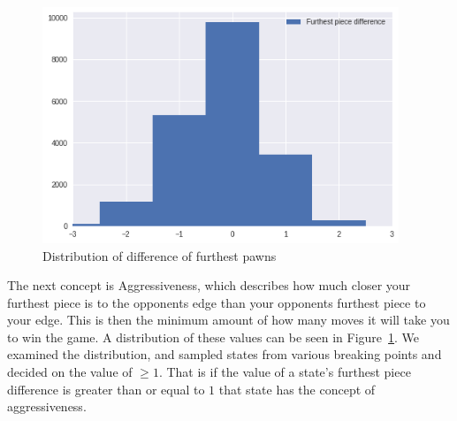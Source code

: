 \begin{figure}
    \begin{small}
        \begin{center}
            \includegraphics[width=0.95\textwidth]{graphics/dist_aggressiveness}
        \end{center}
        \caption{Distribution of difference of furthest pawns}
        \label{fig:dist_aggressiveness}
    \end{small}
\end{figure}


The next concept is Aggressiveness, which describes how much closer your furthest piece is to the opponents edge than your opponents furthest piece to your edge. This is then the minimum amount of how many moves it will take you to win the game. A distribution of these values can be seen in Figure~\ref{fig:dist_aggressiveness}. We examined the distribution, and sampled states from various breaking points and decided on the value of $\geq 1$. That is if the value of a state's furthest piece difference is greater than or equal to $1$ that state has the concept of aggressiveness.

